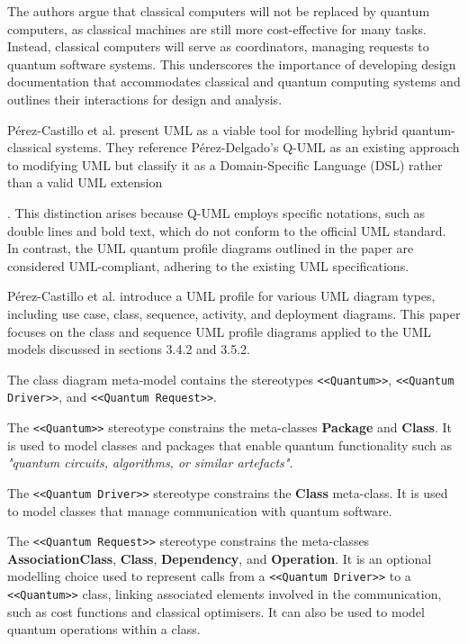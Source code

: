\documentclass{article}
\newcounter{subsubsubsection}[subsubsection]
\begin{document}
{The authors argue that classical computers will not be replaced by quantum computers, as classical machines are still more cost-effective for many tasks. Instead, classical computers will serve as coordinators, managing requests to quantum software systems\cite{Pérez-Castillo2022}. This underscores the importance of developing design documentation that accommodates classical and quantum computing systems and outlines their interactions for design and analysis.

Pérez-Castillo et al. present UML as a viable tool for modelling hybrid quantum-classical systems. They reference Pérez-Delgado's Q-UML as an existing approach to modifying UML but classify it as a Domain-Specific Language (DSL) rather than a valid UML extension\cite{Pérez-Castillo2022}}. This distinction arises because Q-UML employs specific notations, such as double lines and bold text, which do not conform to the official UML standard. In contrast, the UML quantum profile diagrams outlined in the paper are considered UML-compliant, adhering to the existing UML specifications\cite{Pérez-Castillo2022}. 

Pérez-Castillo et al. introduce a UML profile for various UML diagram types, including use case, class, sequence, activity, and deployment diagrams. This paper focuses on the class and sequence UML profile diagrams applied to the UML models discussed in sections 3.4.2 and 3.5.2.


The class diagram meta-model contains the stereotypes \texttt{<<Quantum>>}, \texttt{<<Quantum Driver>>}, and \texttt{<<Quantum Request>>}.

The \texttt{<<Quantum>>} stereotype constrains the meta-classes \textbf{Package} and \textbf{Class}. It is used to model classes and packages that enable quantum functionality such as \textit{"quantum
circuits, algorithms, or similar artefacts"}\cite{Pérez-Castillo2022}.

The \texttt{<<Quantum Driver>>} stereotype constrains the \textbf{Class} meta-class. It is used to model classes that manage communication with quantum software\cite{Pérez-Castillo2022}. 

The \texttt{<<Quantum Request>>} stereotype constrains the meta-classes \textbf{AssociationClass}, \textbf{Class}, \textbf{Dependency}, and \textbf{Operation}. It is an optional modelling choice used to represent calls from a \texttt{<<Quantum Driver>>} to a \texttt{<<Quantum>>} class, linking associated elements involved in the communication, such as cost functions and classical optimisers. It can also be used to model quantum operations within a class\cite{Pérez-Castillo2022}.
\end{document}
